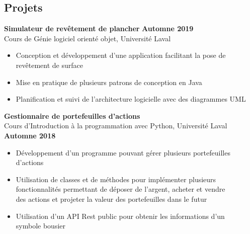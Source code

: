 \documentclass[margin,line]{resume}
\begin{document}
\begin{resume}
    \section{\mysidestyle Projets}
    \textbf{Simulateur de revêtement de plancher} \hfill \textbf{Automne 2019}
    \vspace{2mm}\\\vspace{1mm}
    Cours de Génie logiciel orienté objet, Université Laval
    \begin{itemize}[nosep]
        \item Conception et développement d'une application facilitant la pose de
        \\    revêtement de surface
        \item Mise en pratique de plusieurs patrons de conception en Java
        \item Planification et suivi de l'architecture logicielle avec des diagrammes UML
    \end{itemize}


    \textbf{Gestionnaire de portefeuilles d'actions}
    \vspace{2mm}\\\vspace{1mm}
    Cours d'Introduction à la programmation avec Python, Université Laval \hfill \textbf{Automne 2018}
    \begin{itemize}[nosep]
        \item Développement d'un programme pouvant gérer plusieurs portefeuilles
        \\    d'actions
        \item Utilisation de classes et de méthodes pour implémenter plusieurs
        \\  fonctionnalités permettant de déposer de l'argent, acheter et vendre
        \\  des actions et projeter la valeur des portefeuilles dans le futur
	    \item Utilisation d'un API Rest public pour obtenir les informations d'un
	    \\ symbole bousier
    \end{itemize}


\end{resume}
\end{document}
